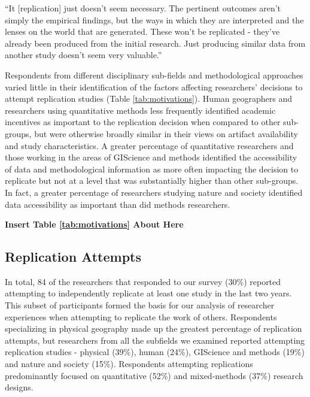 \documentclass[]{interact}
\theoremstyle{plain}%
\theoremstyle{definition}
\theoremstyle{remark}
\begin{document}
\begin{displayquote}
    ``It [replication] just doesn't seem necessary. The pertinent outcomes aren't simply the empirical findings, but the ways in which they are interpreted and the lenses on the world that are generated. These won't be replicated - they've already been produced from the initial research. Just producing similar data from another study doesn't seem very valuable.''
\end{displayquote}

Respondents from different disciplinary sub-fields and methodological approaches varied little in their identification of the factors affecting researchers' decisions to attempt replication studies (Table \ref{tab:motivations}). 
Human geographers and researchers using quantitative methods less frequently identified academic incentives as important to the replication decision when compared to other sub-groups, but were otherwise broadly similar in their views on artifact availability and study characteristics. 
A greater percentage of quantitative researchers and those working in the areas of GIScience and methods identified the accessibility of data and methodological information as more often impacting the decision to replicate but not at a level that was substantially higher than other sub-groups. 
In fact, a greater percentage of researchers studying nature and society identified data accessibility as important than did methods researchers.  

\begin{center}
\textbf{Insert Table \ref{tab:motivations} About Here}
\end{center}

\subsection*{Replication Attempts}
In total, 84 of the researchers that responded to our survey (30\%) reported attempting to independently replicate at least one study in the last two years.   
This subset of participants formed the basis for our analysis of researcher experiences when attempting to replicate the work of others.
Respondents specializing in physical geography made up the greatest percentage of replication attempts, but researchers from all the subfields we examined reported attempting replication studies - physical (39\%), human (24\%), GIScience and methods (19\%) and nature and society (15\%).  
Respondents attempting replications predominantly focused on quantitative (52\%) and mixed-methods (37\%) research designs. 
\end{document}
